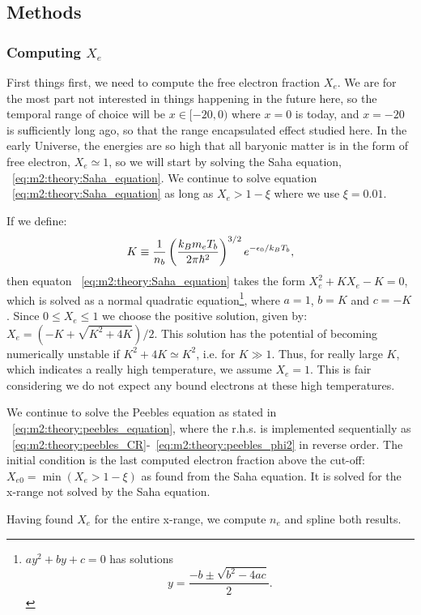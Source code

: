 \subsection{Methods}\label{sec:m2:methods}

\subsubsection{Computing $X_e$}\label{sec:m2:methods:electron_fraction}
    First things first, we need to compute the free electron fraction $X_e$. We are for the most part not interested in things happening in the future here, so the temporal range of choice will be $x\in[-20,0)$ where $x=0$ is today, and $x=-20$ is sufficiently long ago, so that the range encapsulated effect studied here. In the early Universe, the energies are so high that all baryonic matter is in the form of free electron, $X_e\simeq1$, so we will start by solving the Saha equation, ~\cref{eq:m2:theory:Saha_equation}. We continue to solve equation ~\cref{eq:m2:theory:Saha_equation} as long as $X_e>1-\xi$ where we use $\xi=0.01$.

    If we define:
    \begin{equation}
        K \equiv \frac{1}{n_b}\left(\frac{k_Bm_eT_b}{2\pi\hbar^2}\right)^{3/2}e^{-\epsilon_0/k_BT_b},
    \end{equation}
    then equaton ~\cref{eq:m2:theory:Saha_equation} takes the form $X_e^2 + KX_e - K = 0$, which is solved as a normal quadratic equation\footnote{$ay^2+by+c=0$ has solutions $$y=\frac{-b\pm\sqrt{b^2-4ac}}{2}.$$}, where $a=1$, $b=K$ and $c=-K$. Since $0\leq X_e\leq1$ we choose the positive solution, given by: $X_e = (-K+\sqrt{K^2+4K})/2$. This solution has the potential of becoming numerically unstable if $K^2+4K \simeq K^2$, i.e. for $K\gg1$. Thus, for really large $K$, which indicates a really high temperature, we assume $X_e=1$. This is fair considering we do not expect any bound electrons at these high temperatures. 


    We continue to solve the Peebles equation as stated in ~\cref{eq:m2:theory:peebles_equation}, where the r.h.s. is implemented sequentially as ~\cref{eq:m2:theory:peebles_CR}-~\cref{eq:m2:theory:peebles_phi2} in reverse order. The initial condition is the last computed electron fraction above the cut-off: $X_{e0}=\min(X_e>1-\xi)$ as found from the Saha equation. It is solved for the x-range not solved by the Saha equation. 

    Having found $X_e$ for the entire x-range, we compute $n_e$ and spline both results.

